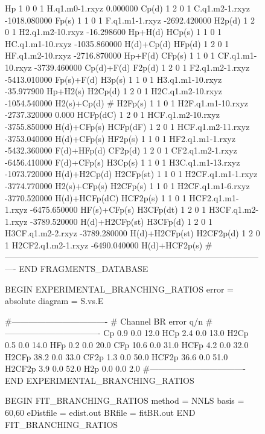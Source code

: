 \documentclass[a4paper,12pt]{article}
\begin{document}
\begin{figure}[h]
\begin{bbifile}[caption=M3C input file CH2F2+.m3c]
			   Hp    1  0  0    1         H.q1.m0-1.rxyz            0.000000
		    Cp(d)    1  2  0    1         C.q1.m2-1.rxyz        -1018.080000
		    Fp(s)    1  1  0    1         F.q1.m1-1.rxyz        -2692.420000
		   H2p(d)    1  2  0    1       H2.q1.m2-10.rxyz          -16.298600             Hp+H(d)  
		   HCp(s)    1  1  0    1       HC.q1.m1-10.rxyz        -1035.860000          H(d)+Cp(d)  
		   HFp(d)    1  2  0    1       HF.q1.m2-10.rxyz        -2716.870000             Hp+F(d)  
		   CFp(s)    1  1  0    1       CF.q1.m1-10.rxyz        -3739.460000          Cp(d)+F(d)  
		   F2p(d)    1  2  0    1        F2.q1.m2-1.rxyz        -5413.010000          Fp(s)+F(d)  
		   H3p(s)    1  1  0    1       H3.q1.m1-10.rxyz          -35.977900            Hp+H2(s)  
		  H2Cp(d)    1  2  0    1      H2C.q1.m2-10.rxyz        -1054.540000         H2(s)+Cp(d)  
#	      H2Fp(s)    1  1  0    1      H2F.q1.m1-10.rxyz        -2737.320000               0.000
		 HCFp(dC)    1  2  0    1      HCF.q1.m2-10.rxyz        -3755.850000         H(d)+CFp(s)  
		 HCFp(dF)    1  2  0    1      HCF.q1.m2-11.rxyz        -3753.040000         H(d)+CFp(s)  
		  HF2p(s)    1  1  0    1       HF2.q1.m1-1.rxyz        -5432.360000         F(d)+HFp(d)  
		  CF2p(d)    1  2  0    1       CF2.q1.m2-1.rxyz        -6456.410000         F(d)+CFp(s)  
		  H3Cp(s)    1  1  0    1      H3C.q1.m1-13.rxyz        -1073.720000        H(d)+H2Cp(d)  
		H2CFp(st)    1  1  0    1      H2CF.q1.m1-1.rxyz        -3774.770000        H2(s)+CFp(s)
		 H2CFp(s)    1  1  0    1      H2CF.q1.m1-6.rxyz        -3770.520000       H(d)+HCFp(dC)
		 HCF2p(s)    1  1  0    1      HCF2.q1.m1-1.rxyz        -6475.650000        HF(s)+CFp(s)  
		H3CFp(dt)    1  2  0    1      H3CF.q1.m2-1.rxyz        -3789.520000      H(d)+H2CFp(st)  
		 H3CFp(d)    1  2  0    1      H3CF.q1.m2-2.rxyz        -3789.280000      H(d)+H2CFp(st)  
		H2CF2p(d)    1  2  0    1     H2CF2.q1.m2-1.rxyz        -6490.040000       H(d)+HCF2p(s)  
	#----------------------------------------------------------------------------------------------
END FRAGMENTS_DATABASE

BEGIN EXPERIMENTAL_BRANCHING_RATIOS
        error = absolute
        diagram = S.vs.E

        #----------------------------------
        #  Channel     BR   error   q/n
        #----------------------------------
                Cp    0.9     0.0   12.0
               HCp    2.4     0.0   13.0  
              H2Cp    0.5     0.0   14.0
               HFp    0.2     0.0   20.0  
               CFp   10.6     0.0   31.0  
              HCFp    4.2     0.0   32.0
             H2CFp   38.2     0.0   33.0  
              CF2p    1.3     0.0   50.0  
             HCF2p   36.6     0.0   51.0  
            H2CF2p    3.9     0.0   52.0
               H2p    0.0     0.0    2.0
        #----------------------------------
END EXPERIMENTAL_BRANCHING_RATIOS

BEGIN FIT_BRANCHING_RATIOS
        method = NNLS
        basis = 60,60
        eDistfile = edist.out
        BRfile = fitBR.out
END FIT_BRANCHING_RATIOS
\end{bbifile}

\caption*{}
\end{figure}
\end{document}
